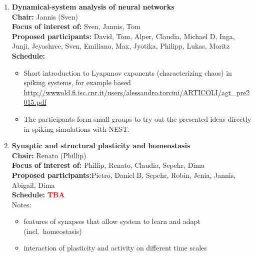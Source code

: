 \documentclass[10pt, a4paper,twoside,american]{article}
\newcommand{\alert}[1]{\textcolor{red}{\bf #1}}
\begin{document}
\begin{enumerate}[resume]
\item {\large\bf Dynamical-system analysis of neural networks}\\[1ex]
  {\bf Chair:} Jannis (Sven)\\[1ex]
  {\bf Focus of interest of:} Sven, Jannis,  Tom\\[1ex]
  {\bf Proposed participants:} David, Tom, Alper, Claudia, Michael D, Inga, Junji, Jeyashree, Sven, Emiliano, Max, Jyotika, Philipp, Lukas, Moritz\\[1ex]
  {\bf Schedule:}
  \begin{itemize}
  \item Short introduction to Lyapunov exponents (characterizing
    chaos) in spiking systems, for example based \url{http://wwwold.fi.isc.cnr.it/users/alessandro.torcini/ARTICOLI/agt_pre2015.pdf}
  \item The participants form small groups to try out the presented
    ideas directly in spiking simulations with NEST.
  \end{itemize}
\item {\large\bf Synaptic and structural plasticity and homeostasis}\\[1ex]
  {\bf Chair:} Renato (Phillip)\\[1ex]
  {\bf Focus of interest of:} Phillip, Renato, Claudia, Sepehr, Dima\\[1ex]
  {\bf Proposed participants:}Pietro, Daniel B, Sepehr, Robin, Jenia, Jannis, Abigail, Dima\\[1ex]
  {\bf Schedule:} \alert{TBA}\\[1ex]
  Notes:
  \begin{itemize}
  \item features of synapses that allow system to learn and adapt (incl.~homeostasis) 
  \item interaction of plasticity and activity on different time scales 

\end{itemize}
\end{enumerate}
\end{document}
